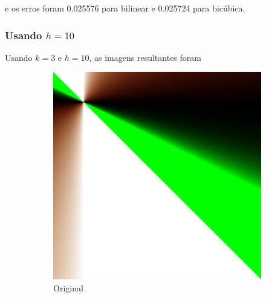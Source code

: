 \documentclass{article}
\begin{document}
e os erros foram 0.025576 para bilinear e 0.025724 para bicúbica.

\newpage

\subsubsection[Usando h=10]{Usando $h=10$}

Usando $k=3$ e $h=10$, as imagens resultantes foram

\begin{figure}[ht]
  \centering
  \begin{subfigure}{0.23\textwidth}
    \centering
    \includegraphics[width=\textwidth]{polinomial/polinomial.png}
    \caption{Original}
  \end{subfigure}%
  \hfill
  \begin{subfigure}{0.23\textwidth}
    \centering

\end{subfigure}
\end{figure}
\end{document}
